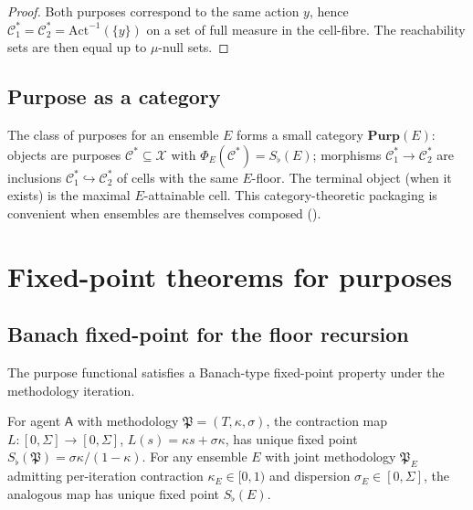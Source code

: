 \documentclass[11pt,a4paper]{article}
\newcommand{\X}{\mathcal{X}}
\newcommand{\Cell}{\mathcal{C}}
\newcommand{\Method}{\mathfrak{P}}
\newcommand{\agent}{\mathsf{A}}
\newcommand{\Sfloor}{S_{\flat}}
\newcommand{\Action}{\mathrm{Act}}
\begin{document}
\begin{proof}
Both purposes correspond to the same action $y$, hence
$\Cell^*_1=\Cell^*_2=\Action^{-1}(\{y\})$ on a set of full measure
in the cell-fibre. The reachability sets are then equal up to
$\mu$-null sets.
\end{proof}

\subsection{Purpose as a category}

\begin{remark}\label{rem:cat-purpose}
The class of purposes for an ensemble $E$ forms a
small category $\mathbf{Purp}(E)$:
objects are purposes $\Cell^*\subseteq\X$ with $\Phi_E(\Cell^*)=
\Sfloor(E)$; morphisms $\Cell^*_1\to\Cell^*_2$ are inclusions
$\Cell^*_1\hookrightarrow\Cell^*_2$ of cells with the same $E$-floor.
The terminal object (when it exists) is the maximal $E$-attainable
cell. This category-theoretic packaging is convenient when ensembles
are themselves composed ().
\end{remark}

\section{Fixed-point theorems for purposes}
\label{sec:fixedpoint}

\subsection{Banach fixed-point for the floor recursion}

The purpose functional satisfies a Banach-type
fixed-point property under the methodology iteration.

\begin{theorem}\label{thm:floor-fp}
For agent $\agent$ with methodology $\Method=(T,\kappa,\sigma)$, the
contraction map $L:[0,\Sigma]\to[0,\Sigma]$,
$L(s)=\kappa s+\sigma\kappa$, has unique fixed point
$\Sfloor(\Method)=\sigma\kappa/(1-\kappa)$. For any ensemble $E$ with
joint methodology $\Method_E$ admitting per-iteration contraction
$\kappa_E\in[0,1)$ and dispersion $\sigma_E\in[0,\Sigma]$, the
analogous map has unique fixed point $\Sfloor(E)$.
\end{theorem}
\end{document}

